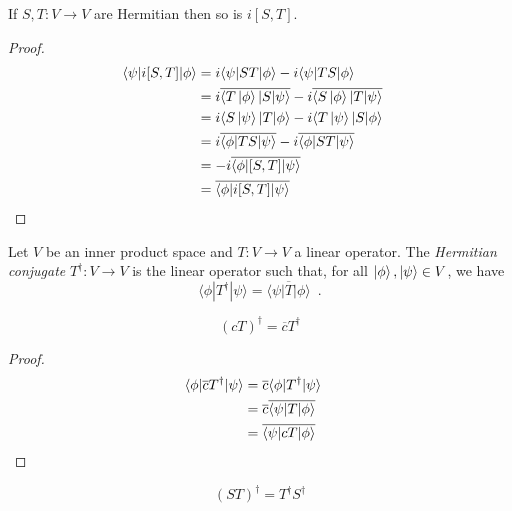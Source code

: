 \begin{prop}
If $S, T : V \rightarrow V$ are Hermitian then so is $i[S,T]$.
\end{prop}

\begin{proof}
\pf
\begin{align*}
	\langle \psi | i[S,T] | \phi \rangle
	& = i\langle \psi | ST | \phi \rangle - i\langle \psi | TS | \phi \rangle \\
	& = i \overline{\langle T \ket{\phi} | S | \psi \rangle} - i \overline{\langle S \ket{\phi} | T | \psi \rangle} \\
	& = i \langle S \ket{\psi} | T | \phi \rangle - i \langle T \ket{\psi} | S | \phi \rangle \\
	& = i \overline{\langle \phi | TS | \psi \rangle} -i \overline{\langle \phi | ST | \psi \rangle} \\
	& = -i \overline{\langle \phi | [S,T] | \psi \rangle} \\
	& = \overline{\langle \phi | i[S,T] | \psi \rangle} & \qed
\end{align*}
\end{proof}

\begin{df}
Let $V$ be an inner product space and $T : V \rightarrow V$ a linear operator. The \emph{Hermitian conjugate} $T^\dagger : V \rightarrow V$ is the linear operator such that, for all $\ket{\phi}, \ket{\psi} \in V$, we have
\[ \langle \phi | T^\dagger | \psi \rangle = \overline{\langle \psi | T | \phi \rangle} \enspace . \]
\end{df}

\begin{prop}
\[ (cT)^\dagger = \overline{c} T^\dagger \]
\end{prop}

\begin{proof}
\pf
\begin{align*}
\langle \phi | \overline{c} T^\dagger | \psi \rangle
& = \overline{c} \langle \phi | T^\dagger | \psi \rangle \\
& = \overline{c} \overline{\langle \psi | T | \phi \rangle} \\
& = \overline{\langle \psi | cT | \phi \rangle} & \qed
\end{align*}
\end{proof}

\begin{prop}
\[ (ST)^\dagger = T^\dagger S^\dagger \]
\end{prop}

